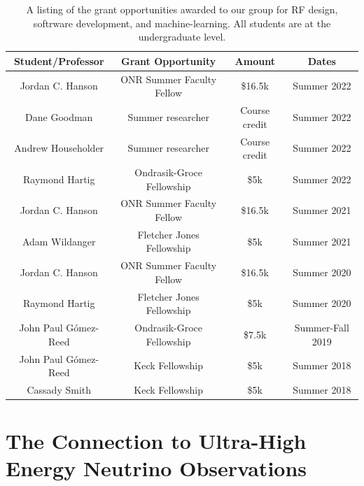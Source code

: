 \documentclass[../../main.tex]{subfiles}
\begin{document}
\begin{table}
\centering
\begin{tabular}{c c c c}
Student/Professor & Grant Opportunity & Amount & Dates \\ \hline
Jordan C. Hanson & ONR Summer Faculty Fellow & \$16.5k & Summer 2022 \\
Dane Goodman & Summer researcher & Course credit & Summer 2022 \\
Andrew Householder & Summer researcher & Course credit & Summer 2022 \\
Raymond Hartig & Ondrasik-Groce Fellowship & \$5k & Summer 2022 \\
Jordan C. Hanson & ONR Summer Faculty Fellow & \$16.5k & Summer 2021 \\
Adam Wildanger & Fletcher Jones Fellowship & \$5k & Summer 2021 \\
Jordan C. Hanson & ONR Summer Faculty Fellow & \$16.5k & Summer 2020 \\
Raymond Hartig & Fletcher Jones Fellowship & \$5k & Summer 2020 \\
John Paul G\'{o}mez-Reed & Ondrasik-Groce Fellowship & \$7.5k & Summer-Fall 2019 \\
John Paul G\'{o}mez-Reed & Keck Fellowship & \$5k & Summer 2018 \\
Cassady Smith & Keck Fellowship & \$5k & Summer 2018 \\
\end{tabular}
\caption{\label{tab:funds} A listing of the grant opportunities awarded to our group for RF design, softrware development, and machine-learning.  All students are at the undergraduate level.}
\end{table}


\section{The Connection to Ultra-High Energy Neutrino Observations}
\label{sec:askaryan}
\end{document}
